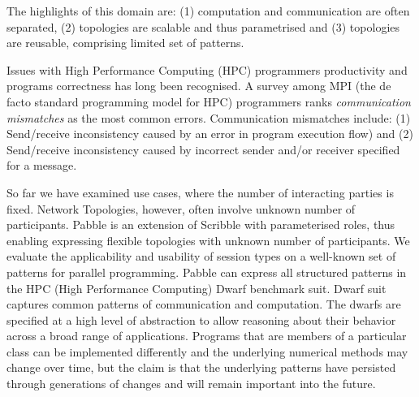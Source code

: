 The highlights of this domain are: (1) computation and communication are often separated, (2) topologies are scalable and thus parametrised and (3) topologies are reusable, comprising limited set of patterns. 

Issues with High Performance Computing (HPC) programmers productivity and programs correctness has long been recognised. A survey among MPI (the de facto standard programming model for HPC) programmers \cite{MPIErrors} ranks \textit{communication mismatches} as the most common errors. Communication mismatches include: (1) Send/receive inconsistency caused by an error in program execution flow) and (2) Send/receive inconsistency caused by incorrect sender and/or receiver specified for a message. 


So far we have examined use cases, where the number of interacting parties is fixed. Network Topologies, however, often involve unknown number of participants. 
Pabble is an extension of Scribble with parameterised roles, thus enabling expressing flexible topologies with unknown number of participants. We evaluate the applicability and usability of session types on a well-known set of patterns for parallel programming. Pabble can express all structured patterns in the HPC (High Performance Computing) Dwarf benchmark suit. Dwarf suit captures common patterns of communication and computation. %
The dwarfs are specified at a high level of abstraction to allow reasoning about their behavior across a broad range of applications. Programs that are members of a particular class can be implemented differently and the underlying numerical methods may change over time, but the claim is that the underlying patterns have persisted through generations of changes and will remain important into the future. 

